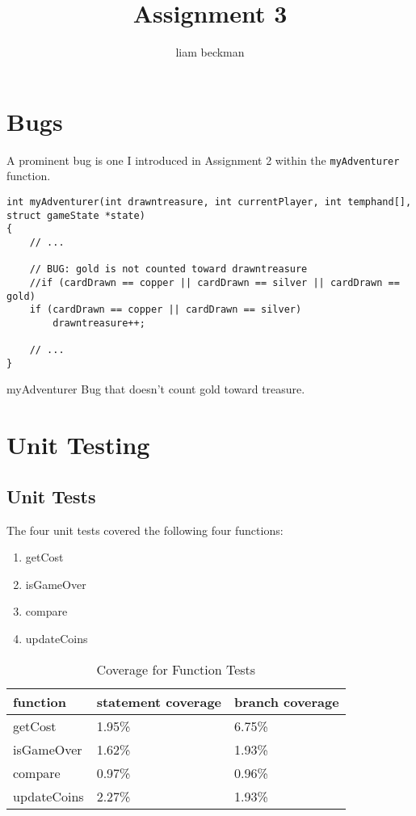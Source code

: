 \documentclass[11pt]{article}
\author{liam beckman}
\date{}
\title{Assignment 3}
\begin{document}
\maketitle

\section{Bugs}
\label{sec:bugs}

A prominent bug is one I introduced in Assignment 2 within the \texttt{myAdventurer} function.

\begin{listing}[htbp]
\begin{verbatim}
int myAdventurer(int drawntreasure, int currentPlayer, int temphand[], struct gameState *state)
{
    // ...

    // BUG: gold is not counted toward drawntreasure
    //if (cardDrawn == copper || cardDrawn == silver || cardDrawn == gold)
    if (cardDrawn == copper || cardDrawn == silver)
        drawntreasure++;
    
    // ...
}
\end{verbatim}
\caption{myAdventurer Bug that doesn't count gold toward treasure.}
\end{listing}

\section{Unit Testing}
\label{sec:unittesting}

\subsection{Unit Tests}
\label{sec:unittests}

The four unit tests covered the following four functions:
\begin{enumerate}
\item getCost
\item isGameOver
\item compare
\item updateCoins
\end{enumerate}

\begin{table}[htbp]
\caption{Coverage for Function Tests}
\centering
\begin{tabular}{lll}
function & statement coverage & branch coverage\\
\hline
getCost & 1.95\% & 6.75\%\\
isGameOver & 1.62\% & 1.93\%\\
compare & 0.97\% & 0.96\%\\
updateCoins & 2.27\% & 1.93\%\\
\end{tabular}
\end{table}
\end{document}
